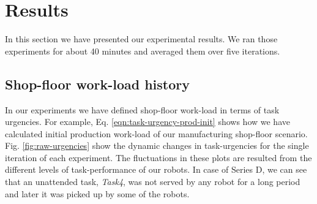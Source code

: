 \documentclass[final,5p,times,twocolumn]{elsarticle}
\begin{document}
\section{Results}
\label{sec:res}
In this section we have presented our experimental results. We ran those experiments for about 40 minutes and averaged them over five iterations. 
\subsection*{Shop-floor work-load history}
In our experiments we have defined shop-floor work-load in terms of task urgencies. For example, Eq. \ref{eqn:task-urgency-prod-init} shows how we have calculated initial production work-load of our manufacturing shop-floor scenario. Fig. \ref{fig:raw-urgencies}  show the dynamic changes in task-urgencies for the single iteration of each experiment. The fluctuations in these plots are resulted from the different levels of task-performance of our robots. In case of Series D, we can see that an unattended task, \textit{Task4}, was not served by any robot for a long period and later it was picked up by some of the robots. 
\end{document}
